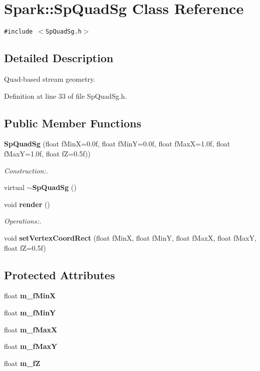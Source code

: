 \section{Spark::Sp\-Quad\-Sg Class Reference}
\label{classSpark_1_1SpQuadSg}
{\tt \#include $<$Sp\-Quad\-Sg.h$>$}



\subsection{Detailed Description}
Quad-based stream geometry. 

Definition at line 33 of file Sp\-Quad\-Sg.h.\subsection*{Public Member Functions}
\begin{CompactItemize}
\item 
{\bf Sp\-Quad\-Sg} (float f\-Min\-X=0.0f, float f\-Min\-Y=0.0f, float f\-Max\-X=1.0f, float f\-Max\-Y=1.0f, float f\-Z=0.5f))
\begin{CompactList}\small\item\em Construction:. \item\end{CompactList}\item 
virtual {\bf $\sim$Sp\-Quad\-Sg} ()
\item 
void {\bf render} ()
\begin{CompactList}\small\item\em Operations:. \item\end{CompactList}\item 
void {\bf set\-Vertex\-Coord\-Rect} (float f\-Min\-X, float f\-Min\-Y, float f\-Max\-X, float f\-Max\-Y, float f\-Z=0.5f)
\end{CompactItemize}
\subsection*{Protected Attributes}
\begin{CompactItemize}
\item 
float {\bf m\_\-f\-Min\-X}
\item 
float {\bf m\_\-f\-Min\-Y}
\item 
float {\bf m\_\-f\-Max\-X}
\item 
float {\bf m\_\-f\-Max\-Y}
\item 
float {\bf m\_\-f\-Z}
\end{CompactItemize}


